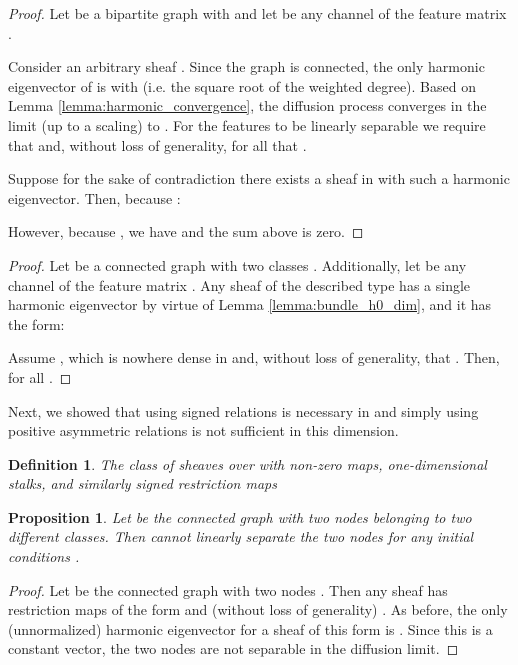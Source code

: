 \documentclass{article}
\newtheorem{proposition}[theorem]{Proposition}
\newtheorem{definition}[theorem]{Definition}
\begin{document}
\HOneSymHeterophily*
\begin{proof}
Let  be a bipartite graph with  and let  be any channel of the feature matrix . 

Consider an arbitrary sheaf . Since the graph is connected, the only harmonic eigenvector of  is  with  (i.e. the square root of the weighted degree). Based on Lemma \ref{lemma:harmonic_convergence}, the diffusion process converges in the limit (up to a scaling) to . For the features to be linearly separable we require that  and, without loss of generality, for all  that . 

Suppose for the sake of contradiction there exists a sheaf in  with such a harmonic eigenvector. Then, because : 

However, because , we have  and the sum above is zero. 
\end{proof}


\HOneLinearSeparation*
\begin{proof}
Let  be a connected graph with two classes . Additionally, let  be any channel of the feature matrix . Any sheaf of the  described type has a single harmonic eigenvector by virtue of Lemma \ref{lemma:bundle_h0_dim}, and it has the form:

Assume , which is nowhere dense in  and, without loss of generality, that . Then,  for all .  
\end{proof}

Next, we showed that using signed relations is necessary in  and simply using positive asymmetric relations is not sufficient in this dimension. 

\begin{definition}
The class of sheaves over  with non-zero maps, one-dimensional stalks, and similarly signed restriction maps 
\end{definition}

\begin{proposition}\label{prop:h1_with_same_sign}
Let  be the connected graph with two nodes belonging to two different classes. Then  cannot linearly separate the two nodes for any initial conditions . 
\end{proposition}

\begin{proof}
Let  be the connected graph with two nodes . Then any sheaf  has restriction maps of the form  and (without loss of generality) . As before, the only (unnormalized) harmonic eigenvector for a sheaf of this form is . Since this is a constant vector, the two nodes are not separable in the diffusion limit. 
\end{proof}
\end{document}
